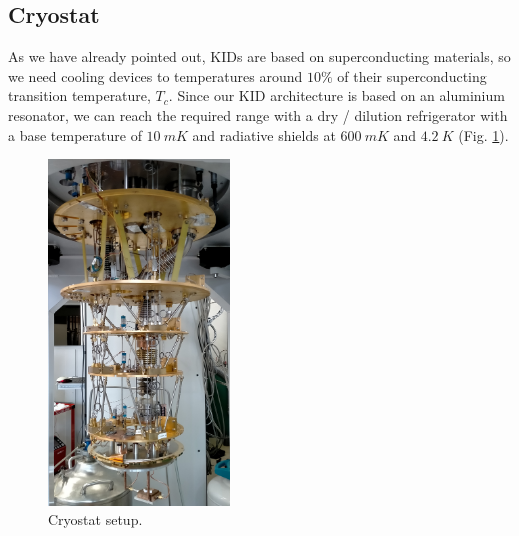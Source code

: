 \documentclass[12pt]{article}
\begin{document}
\subsection{Cryostat}
As we have already pointed out, KIDs are based on superconducting materials, so we need cooling devices to temperatures around $10 \%$ of their superconducting transition temperature, $T_c$. Since our KID architecture is based on an aluminium resonator, we can reach the required range with a dry / dilution refrigerator with a base temperature of $10~mK$ and radiative shields at $600~mK$ and $4.2~K$ (Fig. \ref{fig:Cryo}). \\
\begin{figure}
\centering
\vspace{-0.4cm}
    \includegraphics[width=0.43\textwidth]{IMG20210609095242.jpg}
  \caption{\label{fig:Cryo} Cryostat setup.}
\end{figure}
\end{document}
